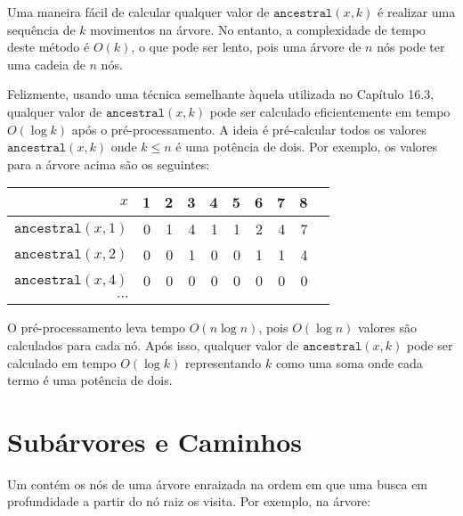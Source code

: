 Uma maneira fácil de calcular qualquer valor de $\texttt{ancestral}(x,k)$ é realizar uma sequência de $k$ movimentos na árvore. No entanto, a complexidade de tempo deste método é $O(k)$, o que pode ser lento, pois uma árvore de $n$ nós pode ter uma cadeia de $n$ nós.

Felizmente, usando uma técnica semelhante àquela utilizada no Capítulo 16.3, qualquer valor de $\texttt{ancestral}(x,k)$ pode ser calculado eficientemente em tempo $O(\log k)$ após o pré-processamento. A ideia é pré-calcular todos os valores $\texttt{ancestral}(x,k)$ onde $k \le n$ é uma potência de dois. Por exemplo, os valores para a árvore acima são os seguintes:

\begin{center}
\begin{tabular}{r|rrrrrrrrr}
$x$ & 1 & 2 & 3 & 4 & 5 & 6 & 7 & 8 \\
\hline
$\texttt{ancestral}(x,1)$ & 0 & 1 & 4 & 1 & 1 & 2 & 4 & 7 \\
$\texttt{ancestral}(x,2)$ & 0 & 0 & 1 & 0 & 0 & 1 & 1 & 4 \\
$\texttt{ancestral}(x,4)$ & 0 & 0 & 0 & 0 & 0 & 0 & 0 & 0 \\
$\cdots$ \\
\end{tabular}
\end{center}

O pré-processamento leva tempo $O(n \log n)$, pois $O(\log n)$ valores são calculados para cada nó. Após isso, qualquer valor de $\texttt{ancestral}(x,k)$ pode ser calculado em tempo $O(\log k)$ representando $k$ como uma soma onde cada termo é uma potência de dois.

\section{Subárvores e Caminhos}


Um  contém os nós de uma árvore enraizada na ordem em que uma busca em profundidade a partir do nó raiz os visita. Por exemplo, na árvore:

\begin{center}
\end{center}

